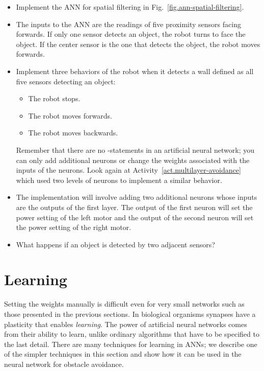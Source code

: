 \begin{framed}
\begin{itemize}
\item Implement the ANN for spatial filtering in Fig.~\ref{fig.ann-spatial-filtering}.
\item The inputs to the ANN are the readings of five proximity sensors facing forwards. If only one sensor detects an object, the robot turns to face the object. If the center sensor is the one that detects the object, the robot moves forwards. 
\item Implement three behaviors of the robot when it detects a wall defined as all five sensors detecting an object:
\begin{itemize}
\item The robot stops.
\item The robot moves forwards.
\item The robot moves backwards.
\end{itemize}
Remember that there are no -statements in an artificial neural network; you can only add additional neurons or change the weights associated with the inputs of the neurons. Look again at Activity~\ref{act.multilayer-avoidance} which used two levels of neurons to implement a similar behavior.
\item The implementation will involve adding two additional neurons whose inputs are the outputs of the first layer. The output of the first neuron will set the power setting of the left motor and the output of the second neuron will set the power setting of the right motor.
\item What happens if an object is detected by two adjacent sensors?
\end{itemize}
\end{framed}

\section{Learning}\label{s.ann-learning}

Setting the weights manually is difficult even for very small networks such as those presented in the previous sections. In biological organisms synapses have a plasticity that enables \emph{learning}. The power of artificial neural networks comes from their ability to learn, unlike ordinary algorithms that have to be specified to the last detail. There are many techniques for learning in ANNs; we describe one of the simpler techniques in this section and show how it can be used in the neural network for obstacle avoidance.

